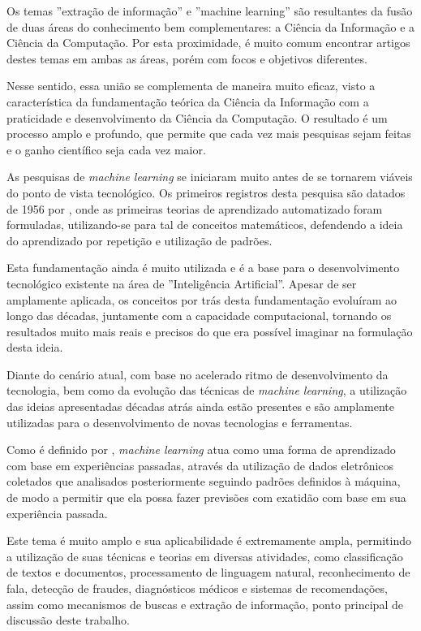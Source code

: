 \begin{textnew}

Os temas ''extração de informação'' e ''machine learning'' são resultantes da fusão de duas áreas do conhecimento bem complementares: a Ciência da Informação e a Ciência da Computação. Por esta proximidade, é muito comum encontrar artigos destes temas em ambas as áreas, porém com focos e objetivos diferentes.

Nesse sentido, essa união se complementa de maneira muito eficaz, visto a característica da fundamentação teórica da Ciência da Informação com a praticidade e desenvolvimento da Ciência da Computação. O resultado é um processo amplo e profundo, que permite que cada vez mais pesquisas sejam feitas e o ganho científico seja cada vez maior.

As pesquisas de \textit{machine learning} se iniciaram muito antes de se tornarem viáveis do ponto de vista tecnológico. Os primeiros registros desta pesquisa são datados de 1956 por \cite{machine-learning}, onde as primeiras teorias de aprendizado automatizado foram formuladas, utilizando-se para tal de conceitos matemáticos, defendendo a ideia do aprendizado por repetição e utilização de padrões.

Esta fundamentação ainda é muito utilizada e é a base para o desenvolvimento tecnológico existente na área de ''Inteligência Artificial''. Apesar de ser amplamente aplicada, os conceitos por trás desta fundamentação evoluíram ao longo das décadas, juntamente com a capacidade computacional, tornando os resultados muito mais reais e precisos do que era possível imaginar na formulação desta ideia.

Diante do cenário atual, com base no acelerado ritmo de desenvolvimento da tecnologia, bem como da evolução das técnicas de \textit{machine learning}, a utilização das ideias apresentadas décadas atrás ainda estão presentes e são amplamente utilizadas para o desenvolvimento de novas tecnologias e ferramentas.

Como é definido por \cite{foundations-machine-learning}, \textit{machine learning} atua como uma forma de aprendizado com base em experiências passadas, através da utilização de dados eletrônicos coletados que analisados posteriormente seguindo padrões definidos à máquina, de modo a permitir que ela possa fazer previsões com exatidão com base em sua experiência passada.

Este tema é muito amplo e sua aplicabilidade é extremamente ampla, permitindo a utilização de suas técnicas e teorias em diversas atividades, como classificação de textos e documentos, processamento de linguagem natural, reconhecimento de fala, detecção de fraudes, diagnósticos médicos e sistemas de recomendações, assim como mecanismos de buscas e extração de informação, ponto principal de discussão deste trabalho.


\end{textnew}
